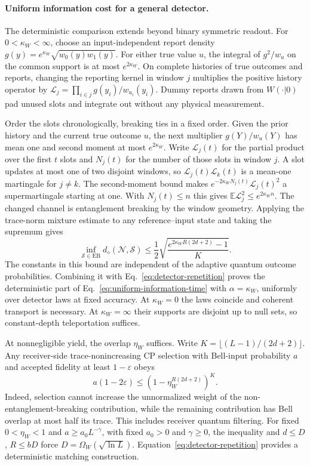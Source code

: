 \documentclass[aps,prl,twocolumn,superscriptaddress,longbibliography,reprint,floatfix]{revtex4-2}
\newcommand{\eps}{\varepsilon}
\newcommand{\channel}{\mathcal N}
\begin{document}
\paragraph*{Uniform information cost for a general detector.}
The deterministic comparison extends beyond binary symmetric readout.
For $0<\kappa_W<\infty$, choose an input-independent report density
$g(y)=e^{\kappa_W}\sqrt{w_0(y)w_1(y)}$.
For either true value $u$, the integral of $g^2/w_u$ on the common
support is at most $e^{2\kappa_W}$. On complete histories of
true outcomes and reports, changing the reporting kernel in window $j$
multiplies the positive history operator by
$\mathcal L_j=\prod_{i\in j}g(y_i)/w_{u_i}(y_i)$.
Dummy reports drawn from $W(\cdot|0)$ pad unused slots and integrate
out without any physical measurement.

Order the slots chronologically, breaking ties in a fixed order.
Given the prior history and the current true outcome $u$, the next
multiplier $g(Y)/w_u(Y)$ has mean one and second moment at most
$e^{2\kappa_W}$. Write $\mathcal L_j(t)$ for the partial product over
the first $t$ slots and $N_j(t)$ for the number of those slots in window
$j$. A slot updates at most one of two disjoint windows, so
$\mathcal L_j(t)\mathcal L_k(t)$ is a mean-one martingale for $j\ne k$.
The second-moment bound makes $e^{-2\kappa_W N_j(t)}\mathcal L_j(t)^2$
a supermartingale starting at one. With $N_j(t)\le n$ this gives
$\mathbb E\mathcal L_j^2\le e^{2\kappa_W n}$.
The changed channel is entanglement breaking by the window geometry.
Applying the trace-norm mixture estimate to any reference--input state
and taking the supremum gives
\begin{equation}
 \inf_{\mathcal S\in\mathrm{EB}}
 d_\diamond(\channel,\mathcal S)
 \le\frac12\sqrt{\frac{e^{2\kappa_W R(2d+2)}-1}{K}}.
 \label{eq:general-statistical-eb}
\end{equation}
The constants in this bound are independent of the adaptive quantum
outcome probabilities. Combining it with Eq.~\eqref{eq:detector-repetition}
proves the deterministic part of Eq.~\eqref{eq:uniform-information-time}
with $\alpha=\kappa_W$, uniformly over detector laws at fixed accuracy.
At $\kappa_W=0$ the laws coincide and coherent transport is necessary.
At $\kappa_W=\infty$ their supports are disjoint up to null sets, so
constant-depth teleportation suffices.

At nonnegligible yield, the overlap $\eta_W$ suffices. Write
$K=\lfloor(L-1)/(2d+2)\rfloor$. Any receiver-side trace-nonincreasing CP selection with Bell-input
probability $a$ and accepted fidelity at least $1-\eps$ obeys
\begin{equation}
 a(1-2\eps)\le
 \left(1-\eta_W^{R(2d+2)}\right)^K.
 \label{eq:detector-yield-bound}
\end{equation}
Indeed, selection cannot increase the unnormalized weight of the
non-entanglement-breaking contribution, while the remaining contribution
has Bell overlap at most half its trace. This includes receiver quantum
filtering. For fixed $0<\eta_W<1$ and $a\ge a_0L^{-\gamma}$, with fixed
$a_0>0$ and $\gamma\ge0$, the inequality and $d\le D$, $R\le bD$ force
$D=\Omega_W(\sqrt{\ln L})$. Equation~\eqref{eq:detector-repetition}
provides a deterministic matching construction.
\end{document}
